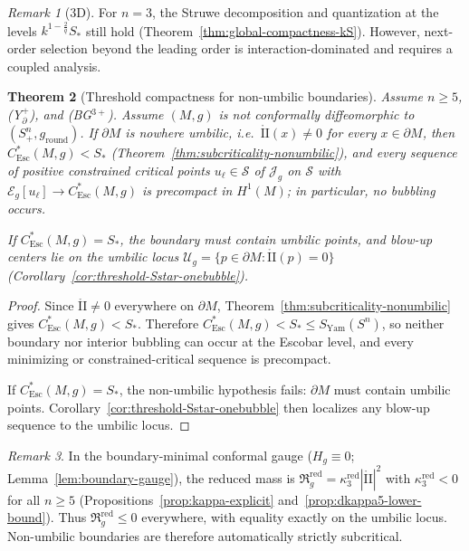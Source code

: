 \documentclass[11pt,reqno,a4paper]{amsart}
\numberwithin{equation}{section}
\theoremstyle{plain}
\newtheorem{theorem}{Theorem}[section]
\newcommand{\Esc}{\ensuremath{\mathrm{Esc}}}
\theoremstyle{remark}
\newtheorem{remark}[theorem]{Remark}
\theoremstyle{plain}
\begin{document}
\begin{remark}[3D]\label{rem:threshold-quant-3D}
For $n=3$, the Struwe decomposition and quantization at the levels $k^{1-\frac{2}{q}}S_\ast$
still hold (Theorem~\ref{thm:global-compactness-kS}). However, next-order selection beyond the leading order is
interaction-dominated and requires a coupled analysis.
\end{remark}


\begin{theorem}[Threshold compactness for non-umbilic boundaries]\label{thm:threshold-compactness-positive-mass}
Assume $n\ge5$, \textup{(Y$^+_{\partial}$)}, and \textup{(BG$^{3+}$)}.
Assume $(M,g)$ is not conformally diffeomorphic to $(S^n_+,g_{\mathrm{round}})$.
If $\partial M$ is nowhere umbilic, i.e.\
$\mathring{\mathrm{II}}(x)\neq 0$ for every $x\in\partial M$,
then $C^*_{\Esc}(M,g)<S_\ast$
(Theorem~\ref{thm:subcriticality-nonumbilic}),
and every sequence of positive constrained critical points
$u_\ell\in\mathcal S$ of $\mathcal J_g$ on $\mathcal S$ with
$\mathcal E_g[u_\ell]\to C^*_{\Esc}(M,g)$
is precompact in $H^1(M)$; in particular, no bubbling occurs.

If $C^*_{\Esc}(M,g)=S_\ast$, the boundary must contain umbilic points,
and blow-up centers lie on the umbilic locus
$\mathcal U_g=\{p\in\partial M:\mathring{\mathrm{II}}(p)=0\}$
(Corollary~\ref{cor:threshold-Sstar-onebubble}).
\end{theorem}

\begin{proof}
Since $\mathring{\mathrm{II}}\neq0$ everywhere on $\partial M$,
Theorem~\ref{thm:subcriticality-nonumbilic} gives $C^*_{\Esc}(M,g)<S_\ast$.
Therefore $C^*_{\Esc}(M,g)<S_\ast\le S_{\mathrm{Yam}}(S^n)$,
so neither boundary nor interior bubbling can occur at the Escobar level,
and every minimizing or constrained-critical sequence is precompact.

If $C^*_{\Esc}(M,g)=S_\ast$, the non-umbilic hypothesis fails:
$\partial M$ must contain umbilic points. Corollary~\ref{cor:threshold-Sstar-onebubble}
then localizes any blow-up sequence to the umbilic locus.
\end{proof}

\begin{remark}
In the boundary-minimal conformal gauge ($H_g\equiv0$; Lemma~\ref{lem:boundary-gauge}),
the reduced mass is $\mathfrak R_g^{\mathrm{red}}=\kappa_3^{\mathrm{red}}|\mathring{\mathrm{II}}|^2$
with $\kappa_3^{\mathrm{red}}<0$ for all $n\ge5$
(Propositions~\ref{prop:kappa-explicit} and~\ref{prop:dkappa5-lower-bound}).
Thus $\mathfrak R_g^{\mathrm{red}}\le0$ everywhere, with equality exactly on the
umbilic locus.
Non-umbilic boundaries are therefore automatically strictly subcritical.
\end{remark}
\end{document}
